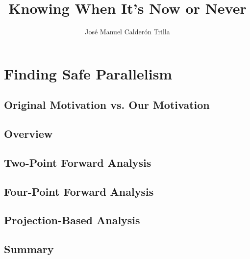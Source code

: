 \documentclass{jfp1}
\title{Knowing When It's Now or Never}
\author{Jos\'{e} Manuel Calder\'{o}n Trilla}
\begin{document}
\chapter{Finding Safe Parallelism}
\label{chap:discovery} 


    \section{Original Motivation vs. Our Motivation}
    

    \section{Overview}
    \label{sec:strictnessOverview}
    

    \section{Two-Point Forward Analysis}
    \label{sec:twoPoint}
    

    \section{Four-Point Forward Analysis}
    \label{sec:fourPoint}
    

    \section{Projection-Based Analysis}
    \label{sec:projections}
    

    \section{Summary}
    \label{sec:summ2}
    

%
%
%
%    
%
%    
%
%
%    
    



\end{document}
